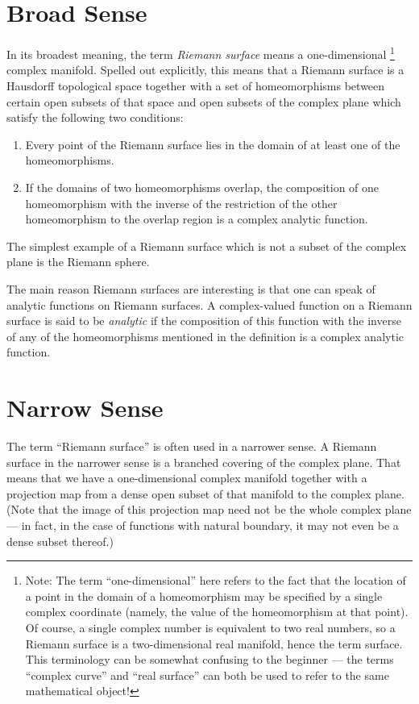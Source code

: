 \documentclass[12pt]{article}
\begin{document}

\section{Broad Sense}

In its broadest meaning, the term \emph{Riemann surface} means a one-dimensional \footnote{Note:  The term ``one-dimensional'' here refers to the fact that the location of a point in the domain of a homeomorphism may be specified by a single complex coordinate (namely, the value of the homeomorphism at that point).  Of course, a single complex number is equivalent to two real numbers, so a Riemann surface is a two-dimensional real manifold, hence the term surface.  This terminology can be somewhat confusing to the beginner --- the terms ``complex curve'' and ``real surface'' can both be used to refer to the same mathematical object!} complex manifold.   Spelled out explicitly, this means that a Riemann surface is a Hausdorff topological space together with a set of homeomorphisms between certain open subsets of that space and open subsets of the complex plane which satisfy the following two conditions:
\begin{enumerate}
\item  Every point of the Riemann surface lies in the domain of at least one of the homeomorphisms.
\item  If the domains of two homeomorphisms overlap, the composition of one homeomorphism with the inverse of the restriction of the other homeomorphism to the overlap region is a complex analytic function.
\end{enumerate}

The simplest example of a Riemann surface which is not a subset of the complex plane is the Riemann sphere.

The main reason Riemann surfaces are interesting is that one can speak of analytic functions on Riemann surfaces.  A complex-valued function on a Riemann surface is said to be \emph{analytic} if the composition of this function with the inverse of any of the homeomorphisms mentioned in the definition is a complex analytic function.

\section{Narrow Sense}

The term ``Riemann surface'' is often used in a narrower sense.  A Riemann surface in the narrower sense is a branched covering of the complex plane.  That means that we have a one-dimensional complex manifold together with a projection map from a dense open subset of that manifold to the complex plane.  (Note that
the image of this projection map need not be the whole complex plane ---
in fact, in the case of functions with natural boundary, it may not even
be a dense subset thereof.)
\end{document}

